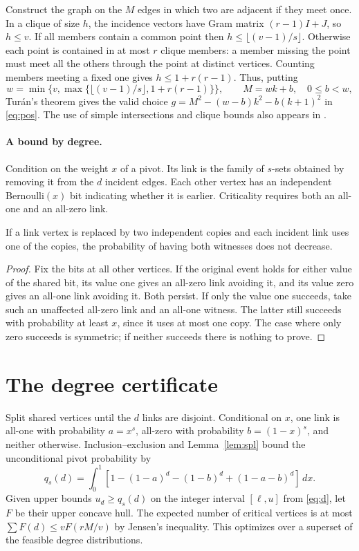 \documentclass[11pt,a4paper]{article}
\begin{document}
Construct the graph on the $M$ edges in which two are adjacent if they meet once. In a clique of size $h$, the incidence vectors have Gram matrix $(r-1)I+J$, so $h\le v$. If all members contain a common point then $h\le\lfloor(v-1)/s\rfloor$. Otherwise each point is contained in at most $r$ clique members: a member missing the point must meet all the others through the point at distinct vertices. Counting members meeting a fixed one gives $h\le1+r(r-1)$. Thus, putting
\[
w=\min\{v,\max\{\lfloor(v-1)/s\rfloor,1+r(r-1)\}\},\qquad M=wk+b,\quad 0\le b<w ,
\]
Tur\'an's theorem gives the valid choice $g=M^2-(w-b)k^2-b(k+1)^2$ in \eqref{eq:pos}. The use of simple intersections and clique bounds also appears in \cite{agl,sii}.

\paragraph{A bound by degree.} Condition on the weight $x$ of a pivot. Its link is the family of $s$-sets obtained by removing it from the $d$ incident edges. Each other vertex has an independent Bernoulli$(x)$ bit indicating whether it is earlier. Criticality requires both an all-one and an all-zero link.
\begin{lemma}[Splitting]\label{lem:spl}
If a link vertex is replaced by two independent copies and each incident link uses one of the copies, the probability of having both witnesses does not decrease.
\end{lemma}
\begin{proof}
Fix the bits at all other vertices. If the original event holds for either value of the shared bit, its value one gives an all-zero link avoiding it, and its value zero gives an all-one link avoiding it. Both persist. If only the value one succeeds, take such an unaffected all-zero link and an all-one witness. The latter still succeeds with probability at least $x$, since it uses at most one copy. The case where only zero succeeds is symmetric; if neither succeeds there is nothing to prove.
\end{proof}
\newpage
\section{The degree certificate}
Split shared vertices until the $d$ links are disjoint. Conditional on $x$, one link is all-one with probability $a=x^s$, all-zero with probability $b=(1-x)^s$, and neither otherwise. Inclusion--exclusion and Lemma~\ref{lem:spl} bound the unconditional pivot probability by
\begin{equation}\label{eq:q}
q_s(d)=\int_0^1\!\left[1-(1-a)^d-(1-b)^d+(1-a-b)^d\right]\,dx .
\end{equation}
Given upper bounds $u_d\ge q_s(d)$ on the integer interval $[\ell,u]$ from \eqref{eq:d}, let $F$ be their upper concave hull. The expected number of critical vertices is at most $\sum F(d)\le v F(rM/v)$ by Jensen's inequality. This optimizes over a superset of the feasible degree distributions.
\end{document}
